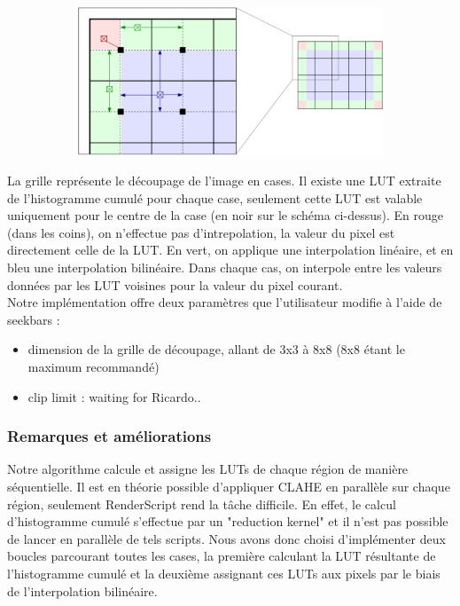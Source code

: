 \begin{figure}[!h]
    \centering
    \begin{subfigure}[b]{0.8\textwidth}
        \includegraphics[width=1\textwidth]{report_src/CLAHE.png}
    \end{subfigure}
\end{figure} 

La grille représente le découpage de l'image en cases. Il existe une LUT extraite de l'histogramme cumulé pour chaque case,
seulement cette LUT est valable uniquement pour le centre de la case (en noir sur le schéma ci-dessus). 
En rouge (dans les coins), on n'effectue pas d'intrepolation, la valeur du pixel est directement celle de la LUT. En vert, 
on applique une interpolation linéaire, et en bleu une interpolation bilinéaire. Dans chaque cas, on interpole entre les valeurs
données par les LUT voisines pour la valeur du pixel courant.
\\

Notre implémentation offre deux paramètres que l'utilisateur modifie à l'aide de seekbars :
\begin{itemize}
    \item{dimension de la grille de découpage, allant de 3x3 à 8x8 (8x8 étant le maximum recommandé)}
    \item{clip limit : waiting for Ricardo..}
\end{itemize}

\subsubsection{Remarques et améliorations}

Notre algorithme calcule et assigne les LUTs de chaque région de manière séquentielle. Il est en théorie possible d'appliquer CLAHE en parallèle
sur chaque région, seulement RenderScript rend la tâche difficile. En effet, le calcul d'histogramme cumulé s'effectue par un "reduction kernel" et il n'est 
pas possible de lancer en parallèle de tels scripts. Nous avons donc choisi d'implémenter deux boucles parcourant toutes les cases,
la première calculant la LUT résultante de l'histogramme cumulé et la deuxième assignant ces LUTs aux pixels par le biais de l'interpolation bilinéaire.
\\

